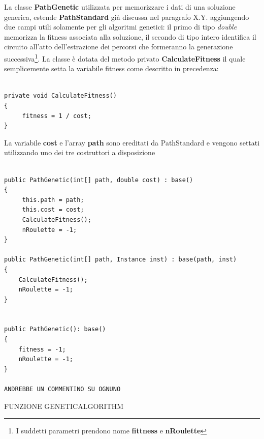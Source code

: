 \documentclass[11pt]{article}
\begin{document}
La classe \textbf{PathGenetic} utilizzata per memorizzare i dati di una soluzione generica, estende \textbf{PathStandard} già discussa nel paragrafo X.Y. aggiungendo due campi utili solamente per gli algoritmi genetici: il primo di tipo \textit{double} memorizza la fitness associata alla soluzione, il secondo di tipo intero identifica il circuito all'atto dell'estrazione dei percorsi che formeranno la generazione successiva\footnote{I suddetti parametri prendono nome \textbf{fittness} e \textbf{nRoulette}}.
La classe è dotata del metodo privato \textbf{CalculateFitness} il quale semplicemente setta la variabile fitness come descritto in precedenza:


\begin{lstlisting}

private void CalculateFitness()
{
     fitness = 1 / cost;
}

\end{lstlisting}

La variabile \textbf{cost} e l’array \textbf{path} sono ereditati da PathStandard e vengono settati utilizzando uno dei tre costruttori a disposizione

\begin{lstlisting}

public PathGenetic(int[] path, double cost) : base()
{
     this.path = path;
     this.cost = cost;
     CalculateFitness();
     nRoulette = -1;
}

public PathGenetic(int[] path, Instance inst) : base(path, inst)
{
    CalculateFitness();
    nRoulette = -1;
}

       
public PathGenetic(): base()
{
    fitness = -1;
    nRoulette = -1;
}

ANDREBBE UN COMMENTINO SU OGNUNO

\end{lstlisting}


\vspace{2\baselineskip}
FUNZIONE GENETICALGORITHM
\vspace{2\baselineskip}
\end{document}
